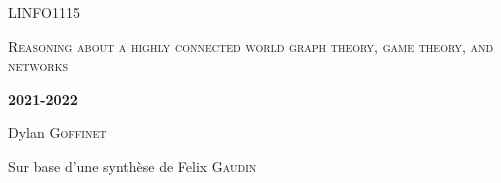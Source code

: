 \documentclass{report}
\begin{document}

\begin{titlepage}
	\centering
	{\scshape\LARGE LINFO1115 \par}
	\vspace{1cm}
	{\scshape\Large Reasoning about a highly connected world graph theory, game theory, and networks \par}
	\vspace{1.5cm}
	{\huge\bfseries 2021-2022\par}
	\vspace{2cm}
	{\Large\itshape\par}
	\vfill
	\vfill
	Dylan \textsc{Goffinet}\par
	Sur base d'une synthèse de Felix \textsc{Gaudin}\par
	{\large \par}
\end{titlepage}


\setcounter{tocdepth}{1} %
\tableofcontents
\clearpage




\end{document}
